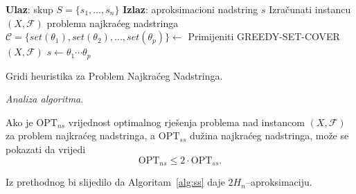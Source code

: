 \documentclass[a4paper, utf8, 11pt, colorlinks]{book}
\theoremstyle{definition}
\begin{document}
  \begin{algorithm}[!t] 
	\begin{algorithmic}[1]
		\STATE \textbf{Ulaz}: skup $S=\{s_1,...,s_n\}$
		\STATE \textbf{Izlaz}: aproksimacioni nadstring $s$
		\STATE Izračunati instancu $(X,\mathcal{F})$ problema najkraćeg nadstringa
		\STATE  $\mathcal{C}=\{set(\theta_1), set(\theta_2),...,set(\theta_p)\}\gets$ Primijeniti GREEDY-SET-COVER$(X,\mathcal{F})$
		\STATE  $s \gets \theta_1 \cdots \theta_p$
	\end{algorithmic}
	\caption{Gridi heuristika za Problem Najkraćeg Nadstringa.}
	\label{alg:ss}
\end{algorithm}

\emph{Analiza algoritma}. 

Ako je $\mathrm{OPT}_{ns}$ vrijednost optimalnog rješenja problema  nad instancom $(X,\mathcal{F})$ za problem  najkraćeg nadstringa, a $\mathrm{OPT}_{ss}$ dužina najkraćeg nadstringa, može se pokazati da vrijedi 
$$\mathrm{OPT}_{ns} \leq 2 \cdot \mathrm{OPT}_{ss}.$$

Iz prethodnog bi slijedilo da Algoritam~\ref{alg:ss} daje $2H_n$--aproksimaciju. 
\end{document}
